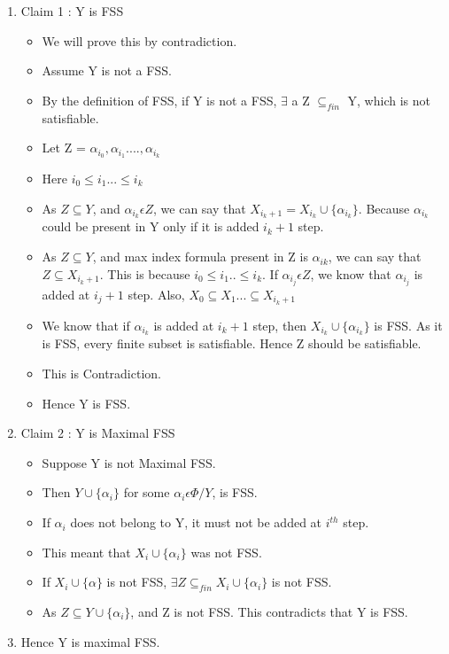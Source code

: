 \documentclass[12pt]{scrartcl}
\begin{document}
\begin{enumerate}
    \item Claim 1 : Y is FSS
    \begin{itemize}
        \item We will prove this by contradiction.
        \item  Assume Y is not a FSS.
        \item By the definition of FSS, if Y is not a FSS, $\exists$ a Z $\subseteq_{fin}$ Y, which is not satisfiable.
        \item Let Z = ${\alpha_{i_{0}},\alpha_{i_{1}}....,\alpha_{i_{k}}}$
        \item  Here $i_{0} \leq i_{1} ...\leq i_{k}$
        \item As $Z \subseteq Y$, and $\alpha_{i_{k}} \epsilon Z$, we can say that $X_{i_{k}+1} = X_{i_{k}} \cup \{\alpha_{i_{k}}\}$. Because $\alpha_{i_{k}}$ could be present in Y only if it is added $i_{k}+1$ step.
        \item As $Z \subseteq Y$, and max index formula present in Z is $\alpha_{i{k}}$, we can say that $Z \subseteq X_{i_{k}+1}$. This is because $i_{0} \leq i_{1} .. \leq i_{k}$. If $\alpha_{i_{j}} \epsilon Z$, we know that $\alpha_{i_{j}}$ is added at $i_{j}+1$ step. Also, $X_{0} \subseteq X_{1} ... \subseteq X_{i_{k}+1}$
        \item We know that if $\alpha_{i_{k}}$ is added at $i_{k}+1$ step, then $X_{i_{k}} \cup \{\alpha_{i_{k}}\}$ is FSS. As it is FSS, every finite subset is satisfiable. Hence Z should be satisfiable.
        \item  This is Contradiction.
        \item Hence Y is FSS.
        
    \end{itemize}
    \item Claim 2 : Y is Maximal FSS
    \begin{itemize}
    \item  Suppose Y is not Maximal FSS.
    \item  Then $Y \cup \{\alpha_{i}\}$ for some $\alpha_{i} \epsilon \Phi/Y$, is FSS.
    \item  If $\alpha_{i}$ does not belong to Y, it must not be added at $i^{th}$ step. 
    \item  This meant that $X_{i} \cup \{\alpha_{i}\}$ was not FSS.
    \item  If $X_{i} \cup \{\alpha\}$ is not FSS, $\exists Z \subseteq_{fin} X_{i} \cup \{\alpha_{i}\}$ is not FSS.
    \item  As $Z \subseteq Y \cup \{\alpha_{i}\}$, and Z is not FSS. This contradicts that Y is FSS.
    \end{itemize}
    \item  Hence Y is maximal FSS.
\end{enumerate}
\end{document}
